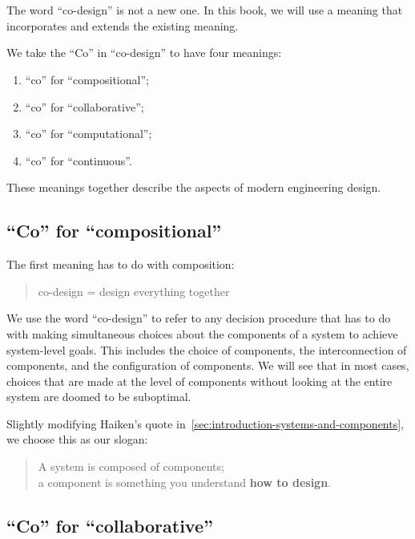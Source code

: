 

\section{}
\label{sec:design-what-is-co-design}

The word ``co-design'' is not a new one. In this book, we will use
a meaning that incorporates and extends the existing meaning.

We take the ``Co'' in ``co-design'' to have four meanings:
\begin{enumerate}
    \item ``co'' for ``compositional'';
    \item ``co'' for ``collaborative'';
    \item ``co'' for ``computational'';
    \item ``co'' for ``continuous''.
\end{enumerate}
These meanings together describe the aspects of modern engineering design.

\subsection{``Co'' for ``compositional''}

The first meaning has to do with composition:

\begin{quote}
    co-design = design everything together
\end{quote}

We use the word ``co-design'' to refer to any decision procedure that has to do with making simultaneous choices about the components of a system to achieve system-level goals.
This includes the choice of components, the interconnection of components, and the configuration of components.
We will see that in most cases, choices that are made at the level of components without looking at the entire system are doomed to be suboptimal.


Slightly modifying Haiken's quote in~\cref{sec:introduction-systems-and-components}, we choose this as our slogan:

\begin{quote}
    A system is composed of components;\\
    a component is something you understand
    \textbf{how to design}.
\end{quote}

\subsection{``Co'' for ``collaborative''}

